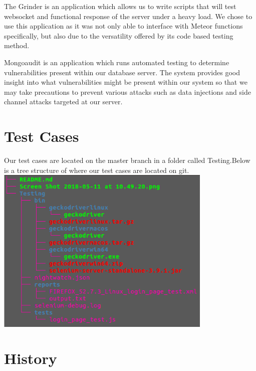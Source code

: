 \documentclass[12pt]{article}
\begin{document}
	The Grinder is an application which allows us to write scripts that will test websocket and functional response of the server under a heavy load. We chose to use this application as it was not only able to interface with Meteor functions specifically, but also due to the versatility offered by its code based testing method.
	
	Mongoaudit is an application which runs automated testing to determine vulnerabilities present within our database server. The system provides good insight into what vulnerabilities might be present within our system so that we may take precautions to prevent various attacks such as data injections and side channel attacks targeted at our server.
	
	
	\section{Test Cases}
	Our test cases are located on the master branch in a folder called Testing.Below is a tree structure of where our test cases are located on git.
	\includegraphics[width=0.8\linewidth, height=8cm]{tree.png}
	
	\section{History}
	
	
	
	
	
	
	
	
	
	
\end{document}
